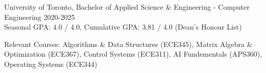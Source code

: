 University of Toronto, Bachelor of Applied Science \& Engineering - Computer Engineering \hfill{2020-2025} \\
Seasonal GPA: 4.0 / 4.0, Cumulative GPA: 3.81 / 4.0 (Dean’s Honour List) \\
\raggedright{Relevant Courses: Algorithms \& Data Structures (ECE345), Matrix Algebra \& Optimization (ECE367), 
Control Systems (ECE311), AI Fundementals (APS360), Operating Systems (ECE344)
}
